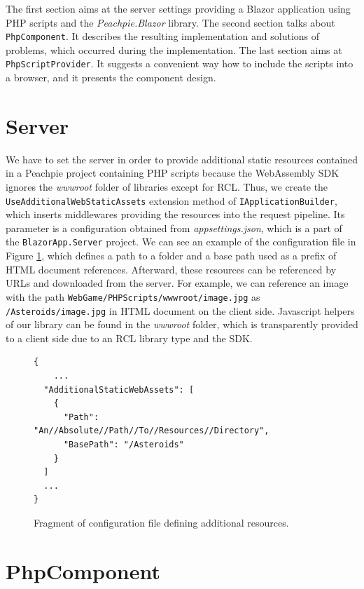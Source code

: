 \par
The first section aims at the server settings providing a Blazor application using PHP scripts and the \textit{Peachpie.Blazor} library.
The second section talks about \texttt{PhpComponent}.
It describes the resulting implementation and solutions of problems, which occurred during the implementation.
The last section aims at \texttt{PhpScriptProvider}.
It suggests a convenient way how to include the scripts into a browser, and it presents the component design.

\section{Server}

We have to set the server in order to provide additional static resources contained in a Peachpie project containing PHP scripts because the WebAssembly SDK ignores the \textit{wwwroot} folder of libraries except for RCL.
Thus, we create the \texttt{UseAdditionalWebStaticAssets} extension method of \texttt{IApplicationBuilder}, which inserts middlewares providing the resources into the request pipeline.
Its parameter is a configuration obtained from \textit{appsettings.json}, which is a part of the \texttt{BlazorApp.Server} project.
We can see an example of the configuration file in Figure \ref{img19:settings}, which defines a path to a folder and a base path used as a prefix of HTML document references.
Afterward, these resources can be referenced by URLs and downloaded from the server.
For example, we can reference an image with the path \texttt{WebGame/PHPScripts/wwwroot/image.jpg} as \texttt{/Asteroids/image.jpg} in HTML document on the client side.
Javascript helpers of our library can be found in the \textit{wwwroot} folder, which is transparently provided to a client side due to an RCL library type and the SDK.
\par
\begin{figure}[H]
\begin{lstlisting}
{
	...
  "AdditionalStaticWebAssets": [
    {
      "Path": "An//Absolute//Path//To//Resources//Directory",
      "BasePath": "/Asteroids"
    }
  ]
  ...
}

\end{lstlisting}
\caption{Fragment of configuration file defining additional resources.}
\label{img19:settings}
\end{figure}

\section{PhpComponent}

